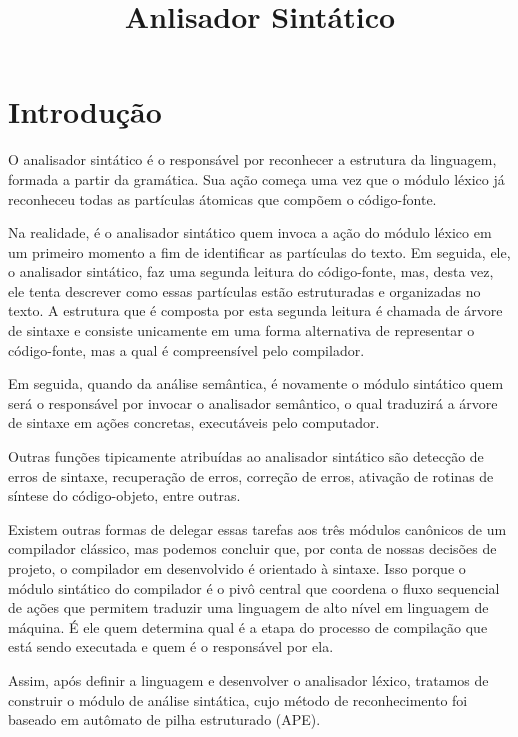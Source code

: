 \documentclass[12pt,oneside,a4paper,english]{abntex2}
\title{Anlisador Sintático}
\begin{document}
\frenchspacing %

\imprimirfolhaderosto

\clearpage

\textual

\chapter{Introdução}

  O analisador sintático é o responsável por reconhecer a estrutura da linguagem, formada a partir da gramática. Sua ação começa uma vez que o módulo léxico já reconheceu todas as partículas átomicas que compõem o código-fonte.


  Na realidade, é o analisador sintático quem invoca a ação do módulo léxico em um primeiro momento a fim de identificar as partículas do texto. Em seguida, ele, o analisador sintático, faz uma segunda leitura do código-fonte, mas, desta vez, ele tenta descrever como essas partículas estão estruturadas e organizadas no texto. A estrutura que é composta por esta segunda leitura é chamada de árvore de sintaxe e consiste unicamente em uma forma alternativa de representar o código-fonte, mas a qual é compreensível pelo compilador.


  Em seguida, quando da análise semântica, é novamente o módulo sintático quem será o responsável por invocar o analisador semântico, o qual traduzirá a árvore de sintaxe em ações concretas, executáveis pelo computador.

        
  Outras funções tipicamente atribuídas ao analisador sintático são detecção de erros de sintaxe, recuperação de erros, correção de erros, ativação de rotinas de síntese do código-objeto, entre outras.


  Existem outras formas de delegar essas tarefas aos três módulos canônicos de um compilador clássico, mas podemos concluir que, por conta de nossas decisões de projeto, o compilador em desenvolvido é orientado à sintaxe. Isso porque o módulo sintático do compilador é o pivô central que coordena o fluxo sequencial de ações que permitem traduzir uma linguagem de alto nível em linguagem de máquina. É ele quem determina qual é a etapa do processo de compilação que está sendo executada e quem é o responsável por ela.

        
  Assim, após definir a linguagem e desenvolver o analisador léxico, tratamos de construir o módulo de análise sintática, cujo método de reconhecimento foi baseado em autômato de pilha estruturado (APE). 
\end{document}
